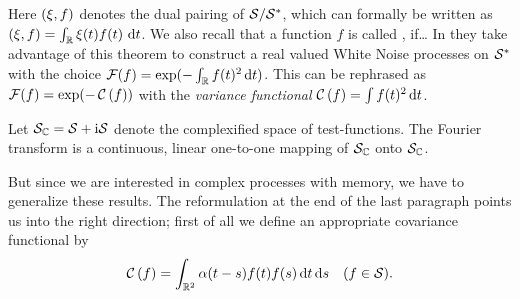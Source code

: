 Here $\left( \xi , f \right)$ denotes the dual pairing of $\mathcal{S}/{\mathcal{S}}^*$, which can formally be written as $\left( \xi , f \right) = \int_{\mathbb{R}} \xi(t) f(t) \, \, \mathrm{d} t$.
We also recall that a function $f$ is called , if\dots
In \cite{HiKuPoSt93_white_noise} they take advantage of this theorem to construct a real valued White Noise processes on ${\mathcal{S}}^*$ with the choice $\CHF(f) = \exp(-\int_\Reals f(t)^2 \dd t)$.
This can be rephrased as $\CHF(f)=\exp(-\,\varf[f])$ with the \emph{variance functional} $\varf[f]=\int f(t)^2 \dd t$.


\begin{lem}
  Let $\mathcal{S}_{\mathbb{C}}=\mathcal{S}+\mathrm{i}\mathcal{S}$ denote the complexified space of test-functions. The Fourier transform is a continuous, linear one-to-one mapping of $\mathcal{S}_{\mathbb{C}}$ onto $\mathcal{S}_{\mathbb{C}}$.
\end{lem}
But since we are interested in complex processes with memory, we have to generalize these results.
The reformulation at the end of the last paragraph points us into the right direction; first of all we define an appropriate covariance functional by
\begin{equation}
  \varf[f] = \int_{\Reals^2} \alpha(t-s) f(t) f(s) \dd t \dd s \quad (f \in\SchwartzS).
  \label{eq:math.def_covfunc}
\end{equation}

